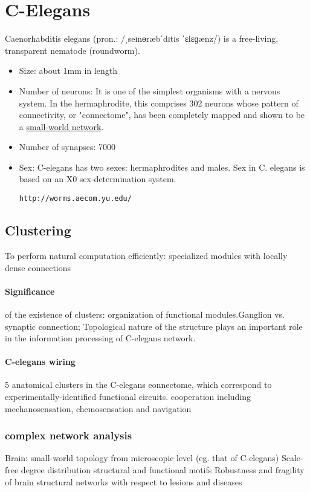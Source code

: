 
\section{C-Elegans} 
\label{section:c-elegans} 

Caenorhabditis elegans (pron.: /ˌseɪnɵræbˈdɪtɪs ˈɛlɛɡænz/) is a free-living, transparent nematode (roundworm).

\begin{itemize}
  \item Size: about 1mm in length
  \item Number of neurons: 
    It is one of the simplest organisms with a nervous system. In the hermaphrodite, this comprises 302 neurons whose pattern of connectivity, or "connectome", has been
    completely mapped and shown to be a \href{http://en.wikipedia.org/wiki/Small-world-network}{small-world network}.
  \item Number of synapses: 7000
  \item Sex: C-elegans has two sexes: hermaphrodites and males. Sex in C. elegans is based on an X0 sex-determination system.

  {\tt http://worms.aecom.yu.edu/}
\end{itemize}

\subsection{Clustering}
To perform natural computation efficiently: specialized modules with locally dense connections

\paragraph{Significance} of the existence of clusters: organization of functional modules.Ganglion vs. synaptic connection;
Topological nature of the structure plays an important role in the information processing of C-elegans network.

\paragraph{C-elegans wiring}
5 anatomical clusters in the C-elegans eonnectome, which correspond to experimentally-identified functional circuits.
cooperation including mechanosensation, chemosensation and navigation

\subsubsection{complex network analysis}
Brain: small-world topology from microscopic level (eg. that of C-elegans)
Scale-free degree distribution
structural and functional motifs
Robustness and fragility of brain structural networks with respect to lesions and diseases

